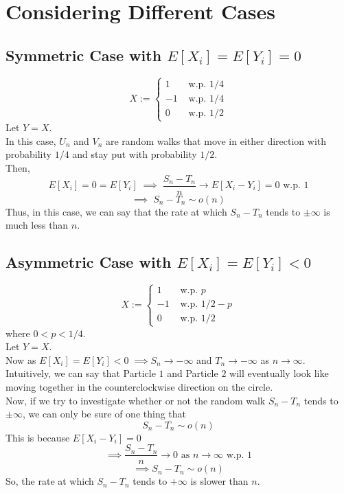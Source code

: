 \documentclass[11pt]{article}
\begin{document}
	\section{Considering Different Cases}
	\subsection{Symmetric Case with $E[X_i] = E[Y_i] = 0$}\label{sym}
	$$X := \begin{cases}
	1 &\text{ w.p. } 1/4\\
	-1 &\text{ w.p. } 1/4\\
	0 &\text{ w.p. } 1/2
	\end{cases}$$
	\noindent Let $Y = X$. \\[2mm]
	In this case, $U_n$ and $V_n$ are random walks that move in either direction with probability $1/4$ and stay put with probability $1/2$.\\
	Then, 
	$$E[X_i] = 0 = E[Y_i] \; \implies \; \frac{S_n - T_n}{n} \to E[X_i - Y_i] = 0 \text{ w.p. } 1$$
	$$\implies \; S_n - T_n \sim o(n)$$
	Thus, in this case, we can say that the rate at which $S_n - T_n$ tends to $\pm \infty$ is much less than $n$.
	\subsection{Asymmetric Case with $E[X_i] = E[Y_i] < 0$}\label{asym1}
	$$X := \begin{cases}
	1 &\text{ w.p. } p\\
	-1 &\text{ w.p. } 1/2 - p\\
	0 &\text{ w.p. } 1/2
	\end{cases}$$
	\noindent where $0< p < 1/4$. \\
	Let $Y = X$. \\[2mm]
	Now as $E[X_i] = E[Y_i] < 0 \; \implies S_n \to -\infty$ and $T_n \to -\infty$ as $n \to \infty$.\\
	Intuitively, we can say that Particle $1$ and Particle $2$ will eventually look like moving together in the counterclockwise direction on the circle. \\
	Now, if we try to investigate whether or not the random walk $S_n - T_n$ tends to $\pm \infty$, we can only be sure of one thing that 
	$$S_n - T_n \sim o(n)$$
	This is because $E[X_i - Y_i] = 0$
	$$\implies \frac{S_n - T_n}{n} \to 0 \text{ as } n \to \infty \text{ w.p. } 1$$
	$$\implies S_n - T_n \sim o(n)$$
	So, the rate at which $S_n - T_n$ tends to $+\infty$ is slower than $n$.
\end{document}
